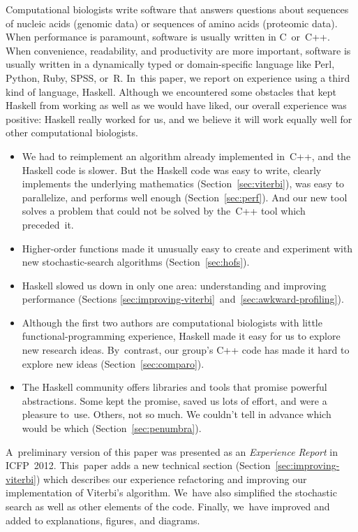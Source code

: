 \documentclass[]{jfp1}
\newcommand\secref[1]{Section~\ref{sec:#1}}
\newcommand\secrefpair[3][and]{Sections \ref{sec:#2}~#1~\ref{sec:#3}}
\begin{document}
Computational biologists write software that answers questions about 
sequences of nucleic acids (genomic data) or sequences of amino 
acids (proteomic data). 
When performance is paramount,
software is usually written in C~or~C++. 
When convenience, readability, and
productivity are more important,
software is usually written in a dynamically typed
or domain-specific language like
Perl, Python, Ruby, SPSS, or~R.
In~this paper, we report on experience using a third kind of language,
Haskell.
Although we encountered some obstacles that kept Haskell from working
as well as we would have liked, our overall experience was positive:
Haskell really worked for us, and we believe it will work equally well
for other computational biologists.
\begin{itemize}
\item
We had to reimplement an
algorithm already implemented in~C++, 
and the Haskell code is slower.
But the Haskell code was easy to write,     %
clearly implements the underlying mathematics
 (\secref{viterbi}),
 was easy to parallelize,
and performs well enough
(\secref{perf}).
  And our new tool solves a problem that could not be solved by
  the~C++ tool which preceded~it.
\item
Higher-order functions made it unusually easy to
create and experiment with new stochastic-search algorithms
(\secref{hofs}).
\item
Haskell slowed us down in only one area:  understanding and
improving
performance (\secrefpair{improving-viterbi}{awkward-profiling}).
\item
Although the first two authors are computational
biologists
with little functional-programming experience,
Haskell made it easy for us to explore new research ideas.
By~contrast,
our group's C++ code has 
made it hard to explore
new ideas
(\secref{comparo}).
\item
The Haskell community offers libraries and tools that
promise powerful abstractions.
Some kept the promise, saved us lots of effort, and were a pleasure
to~use.
Others, not so much.
We couldn't tell in advance which 
would be which
 (\secref{penumbra}).
\end{itemize}
A~preliminary version of this
paper \citep{daniels:haskell-in-bio:2012} was presented as 
an \emph{Experience Report} in ICFP~2012.
This~paper adds a new technical section (\secref{improving-viterbi})
which describes our experience 
refactoring and improving our implementation of Viterbi's 
\citeyearpar{Viterbi:1967hq}
algorithm.
We~have also simplified the stochastic search as well as other elements of
the code.
Finally, we~have improved and added to explanations, figures, and diagrams.
\end{document}
